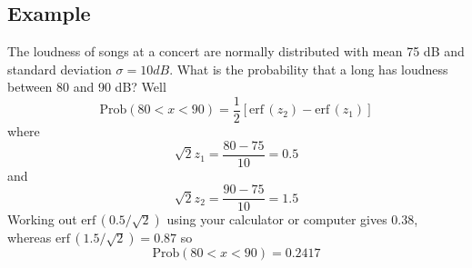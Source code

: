 \documentclass[11pt,a4paper]{scrartcl}
\begin{document}
\subsection*{Example}

The loudness of songs at a concert are normally distributed with mean 75 dB and standard deviation $\sigma=10 dB$. What is the probability that a long has loudness between 80 and 90 dB? Well
\begin{equation}
\mbox{Prob}(80<x<90)=\frac{1}{2}[\mbox{erf}\,(z_2)-\mbox{erf}\,(z_1)]
\end{equation}
where 
\begin{equation}
\sqrt{2}z_1=\frac{80-75}{10}=0.5
\end{equation}
and 
\begin{equation}
\sqrt{2}z_2=\frac{90-75}{10}=1.5
\end{equation}
Working out $\mbox{erf}\,(0.5/\sqrt{2})$ using your calculator or computer gives 0.38, whereas $\mbox{erf}\,(1.5/\sqrt{2})=0.87$ so
\begin{equation}
\mbox{Prob}(80<x<90)=0.2417
\end{equation}
\end{document}
